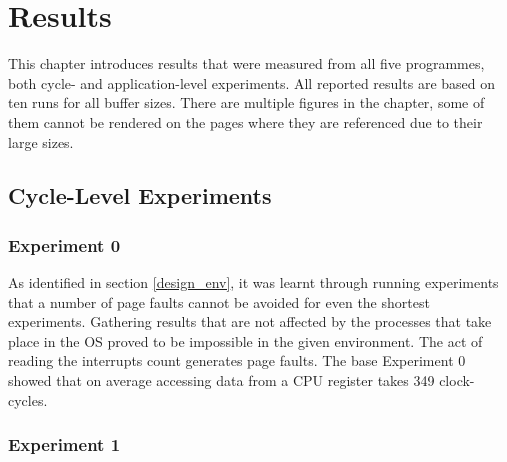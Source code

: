 
\chapter{Results} %
\label{resultsChapter}

This chapter introduces results that were measured from all five programmes, both cycle- and application-level experiments. All reported results are based on ten runs for all buffer sizes. There are multiple figures in the chapter, some of them cannot be rendered on the pages where they are referenced due to their large sizes.


\ifpdf
    \graphicspath{{X/figures/PNG/}{X/figures/PDF/}{X/figures/}}
\else
    \graphicspath{{X/figures/EPS/}{X/figures/}}
\fi


\section{Cycle-Level Experiments}

\label{sec:cycle_results}

\subsection{Experiment 0}

As identified in section \ref{design_env}, it was learnt through running experiments that a number of page faults cannot be avoided for even the shortest experiments. Gathering results that are not affected by the processes that take place in the OS proved to be impossible in the given environment. The act of reading the interrupts count generates page faults. The base Experiment 0 showed that on average accessing data from a CPU register takes 349 clock-cycles.

\subsection{Experiment 1}

